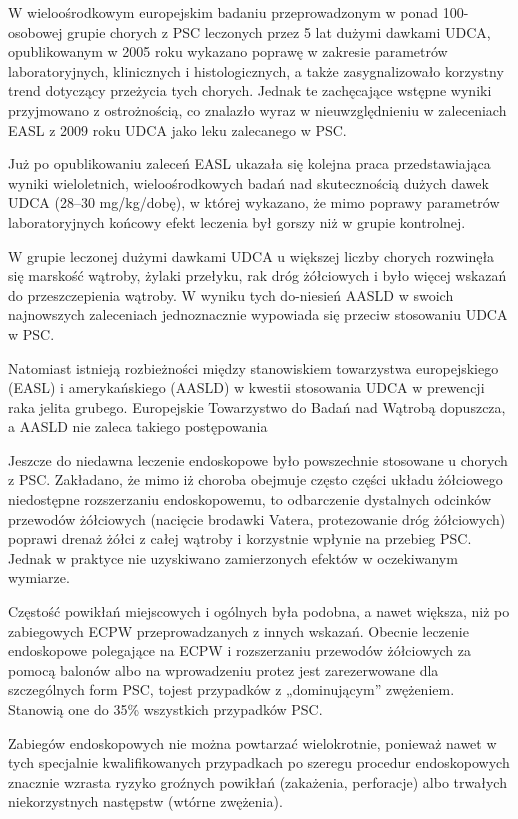 W wieloośrodkowym europejskim badaniu przeprowadzonym w ponad 100-osobowej grupie chorych z PSC leczonych przez 5 lat dużymi dawkami UDCA, opublikowanym w  2005  roku  wykazano  poprawę  w  zakresie parametrów laboratoryjnych, klinicznych i histologicznych,  a  także  zasygnalizowało  korzystny trend dotyczący przeżycia tych chorych.  
Jednak  te  zachęcające  wstępne  wyniki przyjmowano  z  ostrożnością,  co  znalazło  wyraz w nieuwzględnieniu w zaleceniach EASL z  2009  roku  UDCA  jako  leku  zalecanego w  PSC.  

Już  po  opublikowaniu  zaleceń EASL ukazała się kolejna praca przedstawiająca wyniki wieloletnich, wieloośrodkowych badań nad skutecznością dużych dawek UDCA (28–30  mg/kg/dobę),  w  której  wykazano,  że mimo  poprawy  parametrów  laboratoryjnych końcowy  efekt  leczenia  był  gorszy  niż  w  grupie kontrolnej. 

W grupie leczonej dużymi dawkami UDCA u większej liczby chorych rozwinęła się marskość wątroby, żylaki przełyku, rak dróg żółciowych i było więcej wskazań do przeszczepienia  wątroby.  
W  wyniku  tych  do-niesień  AASLD  w  swoich  najnowszych  zaleceniach jednoznacznie wypowiada się przeciw stosowaniu UDCA w PSC.

Natomiast istnieją rozbieżności między stanowiskiem towarzystwa  europejskiego  (EASL)  i  amerykańskiego (AASLD) w kwestii stosowania UDCA w prewencji raka jelita grubego. Europejskie Towarzystwo do Badań nad Wątrobą dopuszcza, a AASLD nie zaleca takiego postępowania

Jeszcze do niedawna leczenie endoskopowe było powszechnie stosowane u chorych z PSC. 
Zakładano, że mimo iż choroba obejmuje często części układu żółciowego niedostępne rozszerzaniu endoskopowemu, to odbarczenie  dystalnych  odcinków  przewodów żółciowych (nacięcie brodawki Vatera, protezowanie dróg żółciowych) poprawi drenaż żółci z całej wątroby i korzystnie wpłynie na przebieg PSC. Jednak w praktyce nie uzyskiwano zamierzonych efektów w oczekiwanym wymiarze.  

Częstość  powikłań  miejscowych i ogólnych była podobna, a nawet większa, niż po  zabiegowych  ECPW  przeprowadzanych z  innych  wskazań.  
Obecnie  leczenie  endoskopowe  polegające  na  ECPW  i  rozszerzaniu przewodów żółciowych za pomocą balonów albo na wprowadzeniu protez jest zarezerwowane  dla  szczególnych  form  PSC,  tojest  przypadków  z  „dominującym”  zwężeniem. 
Stanowią one do 35\% wszystkich  przypadków  PSC.  

Zabiegów endoskopowych  nie  można  powtarzać  wielokrotnie, ponieważ nawet w tych specjalnie kwalifikowanych  przypadkach  po  szeregu procedur  endoskopowych  znacznie  wzrasta ryzyko  groźnych  powikłań  (zakażenia,  perforacje)  albo  trwałych  niekorzystnych  następstw (wtórne zwężenia).

